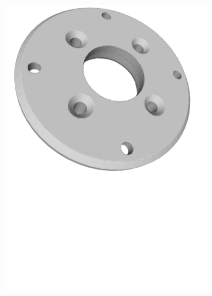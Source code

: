 \begin{figure}[h!]
{\begin{tcolorbox}
\begin{subfigure}[c]{.32\textwidth}
          \includegraphics[trim={0cm 12cm 0cm 0cm},clip,width=1\linewidth,angle=0]{Cap5/Figuras/objects/bearing_holder.pdf}
          \caption{}
          \label{fig:bearing_holder}
      \end{subfigure}
      \hfill
      \begin{subfigure}[c]{.32\textwidth}
          \centering

\end{subfigure}
\end{tcolorbox}}
\end{figure}
